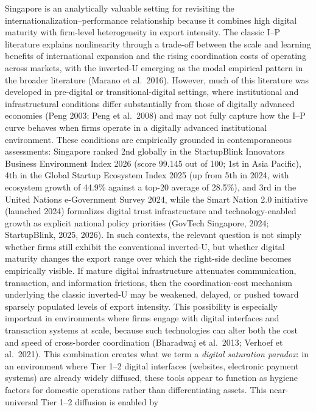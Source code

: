 \documentclass[
  12pt,a4paper]{article}
\begin{document}
Singapore is an analytically valuable setting for revisiting the
internationalization--performance relationship because it combines high
digital maturity with firm-level heterogeneity in export intensity. The
classic I--P literature explains nonlinearity through a trade-off
between the scale and learning benefits of international expansion and
the rising coordination costs of operating across markets, with the
inverted-U emerging as the modal empirical pattern in the broader
literature (Marano et al.~2016). However, much of this literature was
developed in pre-digital or transitional-digital settings, where
institutional and infrastructural conditions differ substantially from
those of digitally advanced economies (Peng 2003; Peng et al.~2008) and
may not fully capture how the I--P curve behaves when firms operate in a
digitally advanced institutional environment. These conditions are
empirically grounded in contemporaneous assessments: Singapore ranked
2nd globally in the StartupBlink Innovators Business Environment Index
2026 (score 99.145 out of 100; 1st in Asia Pacific), 4th in the Global
Startup Ecosystem Index 2025 (up from 5th in 2024, with ecosystem growth
of 44.9\% against a top-20 average of 28.5\%), and 3rd in the United
Nations e-Government Survey 2024, while the Smart Nation 2.0 initiative
(launched 2024) formalizes digital trust infrastructure and
technology-enabled growth as explicit national policy priorities
(GovTech Singapore, 2024; StartupBlink, 2025, 2026). In such contexts,
the relevant question is not simply whether firms still exhibit the
conventional inverted-U, but whether digital maturity changes the export
range over which the right-side decline becomes empirically visible. If
mature digital infrastructure attenuates communication, transaction, and
information frictions, then the coordination-cost mechanism underlying
the classic inverted-U may be weakened, delayed, or pushed toward
sparsely populated levels of export intensity. This possibility is
especially important in environments where firms engage with digital
interfaces and transaction systems at scale, because such technologies
can alter both the cost and speed of cross-border coordination
(Bharadwaj et al.~2013; Verhoef et al.~2021). This combination creates
what we term a \emph{digital saturation paradox}: in an environment
where Tier 1--2 digital interfaces (websites, electronic payment
systems) are already widely diffused, these tools appear to function as
hygiene factors for domestic operations rather than differentiating
assets. This near-universal Tier 1--2 diffusion is enabled by
\end{document}
